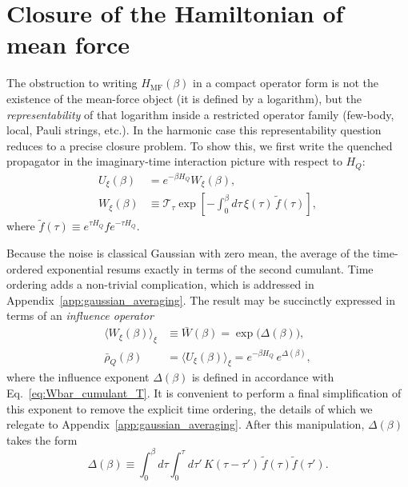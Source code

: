 ﻿%
\section{Closure of the Hamiltonian of mean force \label{sec:closure}\label{sec:qubit_closure}}
The obstruction to writing $H_{\mathrm{MF}}(\beta)$ in a compact operator form is not the
existence of the mean-force object (it is defined by a logarithm), but the \emph{representability} of that logarithm inside a restricted operator family (few-body, local, Pauli strings, etc.). In the harmonic case this representability question reduces to a precise closure problem. To show this, we first write the quenched propagator in the imaginary-time interaction picture with respect to $H_Q$:
\begin{equation}
    \begin{split}
        U_\xi(\beta) & = e^{-\beta H_Q} W_\xi(\beta),                                                             \\
        W_\xi(\beta) & \equiv \mathcal T_\tau \exp\!\left[-\int_0^\beta d\tau\, \xi(\tau)\,\tilde f(\tau)\right],
    \end{split}
    \label{eq:Wxi_def}
\end{equation}
where $\tilde f(\tau)\equiv e^{\tau H_Q} f e^{-\tau H_Q}$.

Because the noise is classical Gaussian with zero mean, the average of the
time-ordered exponential resums exactly in terms of the second cumulant. Time ordering adds a non-trivial complication, which is addressed in Appendix~\ref{app:gaussian_averaging}. The result may be succinctly expressed in terms of an \emph{influence operator}
\begin{equation}
    \begin{split}
          \langle W_\xi(\beta)\rangle_\xi &\equiv \bar W(\beta) = \exp\!\big(\Delta(\beta)\big), \\
        \bar\rho_Q(\beta) &= \langle U_\xi(\beta)\rangle_\xi = e^{-\beta H_Q}\,e^{\Delta(\beta)},
    \end{split}
    \label{eq:rho_bar_product_form}
\end{equation}
where the influence exponent $\Delta(\beta)$ is defined in accordance with Eq.~\eqref{eq:Wbar_cumulant_T}. 
It is convenient to perform a final simplification of this exponent to remove the explicit time ordering, the details of which we relegate to Appendix~\ref{app:gaussian_averaging}. After this manipulation, $\Delta(\beta)$ takes the form
\begin{equation}
\Delta(\beta)\equiv \int_0^\beta d\tau\int_0^\tau d\tau'\,
K(\tau-\tau')\,\tilde f(\tau)\tilde f(\tau').
\label{eq:Delta_def_hermitian}
\end{equation}

